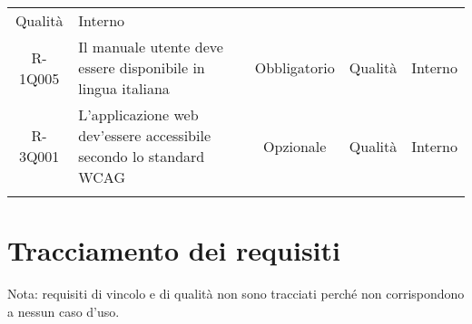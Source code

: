 \begin{tabularx}{\textwidth}{cXccc}
	Qualità &
	
	Interno \\
	R-1Q005 &
	
	Il manuale utente deve essere disponibile in lingua italiana   &
	
	Obbligatorio &
	
	Qualità &
	
	Interno \\
	
	R-3Q001 &
	
	L'applicazione web dev'essere accessibile secondo lo standard WCAG   &
	
	Opzionale &
	
	Qualità &
	
	Interno \\
	\rowcolor{white}
	\caption{Tabella requisiti di qualità} \label{tab:tabellarequisitiqualità}
\end{tabularx}


\section{Tracciamento dei requisiti}
Nota: requisiti di vincolo e di qualità non sono tracciati perché non corrispondono a nessun caso d'uso.
